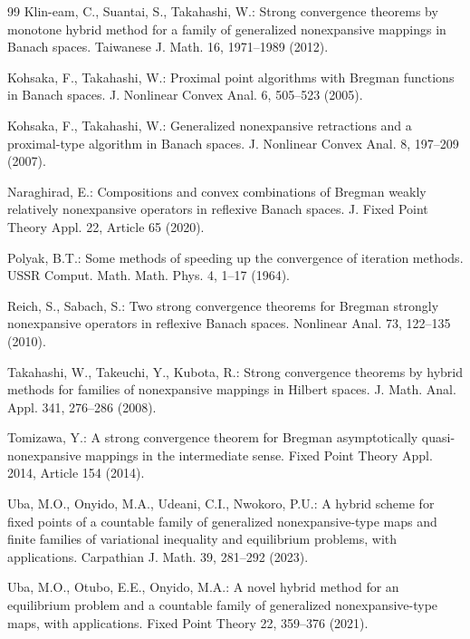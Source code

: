 \documentclass[leqno,12pt]{amsart}
\theoremstyle{definition}
\theoremstyle{remark}
\numberwithin{equation}{section}
\begin{document}
\begin{thebibliography}{99}
Klin-eam, C., Suantai, S., Takahashi, W.: Strong convergence theorems by monotone hybrid method for a family of generalized nonexpansive mappings in Banach spaces. Taiwanese J. Math. 16, 1971--1989 (2012).

Kohsaka, F., Takahashi, W.: Proximal point algorithms with Bregman functions in Banach spaces. J. Nonlinear Convex Anal. 6, 505--523 (2005).

Kohsaka, F., Takahashi, W.: Generalized nonexpansive retractions and a proximal-type algorithm in Banach spaces. J. Nonlinear Convex Anal. 8, 197--209 (2007).

Naraghirad, E.: Compositions and convex combinations of Bregman weakly relatively nonexpansive operators in reflexive Banach spaces. J. Fixed Point Theory Appl. 22, Article 65 (2020).

Polyak, B.T.: Some methods of speeding up the convergence of iteration methods. USSR Comput. Math. Math. Phys. 4, 1--17 (1964).

Reich, S., Sabach, S.: Two strong convergence theorems for Bregman strongly nonexpansive operators in reflexive Banach spaces. Nonlinear Anal. 73, 122--135 (2010).

Takahashi, W., Takeuchi, Y., Kubota, R.: Strong convergence theorems by hybrid methods for families of nonexpansive mappings in Hilbert spaces. J. Math. Anal. Appl. 341, 276--286 (2008).

Tomizawa, Y.: A strong convergence theorem for Bregman asymptotically quasi-nonexpansive mappings in the intermediate sense. Fixed Point Theory Appl. 2014, Article 154 (2014).

Uba, M.O., Onyido, M.A., Udeani, C.I., Nwokoro, P.U.: A hybrid scheme for fixed points of a countable family of generalized nonexpansive-type maps and finite families of variational inequality and equilibrium problems, with applications. Carpathian J. Math. 39, 281--292 (2023).

Uba, M.O., Otubo, E.E., Onyido, M.A.: A novel hybrid method for an equilibrium problem and a countable family of generalized nonexpansive-type maps, with applications. Fixed Point Theory 22, 359--376 (2021).

\end{thebibliography}
\end{document}
